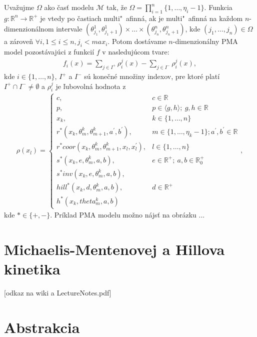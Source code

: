 \documentclass[11pt,final,oneside]{fithesis}
\begin{document}
Uva\v zujme $\Omega$ ako \v cas\v t modelu $\mathcal{M}$ tak, \v ze $\Omega = \prod_{i = 1}^n\{1,\dots{},\eta_i - 1\}$. Funkcia 
$g : \mathbb{R}^n \rightarrow \mathbb{R}^+$ je vtedy po \v castiach multi"~afinn\'a, ak je multi"~afinn\'a na ka\v zdom $n$-dimenzion\'alnom intervale
$(\theta_{j_1}^1,\theta_{j_1 + 1}^1)\times \dots{} \times (\theta_{j_n}^n,\theta_{j_n + 1}^n)$, kde $(j_1,\dots{},j_n) \in \Omega$ a z\'arove\v n 
$\forall{}i, 1 \leq i \leq n, j_i < max_i$. Potom dost\'avame $n$-dimenzion\'alny PMA model pozost\'avaj\'uci z funkci\'i $f$ v nasleduj\'ucom tvare:
\begin{align*}
f_i(x) = \underset{j \in I^+}\sum{\rho_i^j(x)} - \underset{j \in I^-}\sum{\rho_i^j(x)},
\end{align*}
kde $i \in \{1,\dots{},n\}$, $I^+$ a $I^-$ s\'u kone\v cn\'e mno\v ziny indexov, pre ktor\'e plat\'i\ $I^+ \cap I^- \neq \emptyset$ a $\rho_i^j$ je 
\v lubovoln\'a hodnota z 
\begin{align*}
\rho(x_l) = 
\left\{ \begin{array}{cl}
c, &c \in \mathbb{R}\\
p, &p \in \langle g,h \rangle; \ g,h \in \mathbb{R}\\
x_k, & k \in \{1,\dots{},n\}\\
r^*(x_k,\theta_m^k,\theta_{m+1}^k,a^{'},b^{'}), &m \in \{1,\dots{},\eta_k-1\}; a^{'},b^{'} \in \mathbb{R}\\
r^*coor(x_k,\theta_m^k,\theta_{m+1}^k,x_l,x_l^{'}), &l \in \{1,\dots{},n\}\\
s^*(x_k,e,\theta_m^k,a,b), &e \in \mathbb{R}^+; \ a,b \in \mathbb{R}_0^+\\
s^*inv(x_k,e,\theta_m^k,a,b),\\
hill^*(x_k,d,\theta_m^k,a,b), &d \in \mathbb{R}^+\\
h^*(x_k,theta_m^k,a,b)
\end{array} \right. ,
\end{align*}
kde $* \in \{+,-\}$. Pr\'iklad PMA modelu mo\v zno n\'ajs\v t na obr\'azku ...

\section{Michaelis-Mentenovej a Hillova kinetika}
\label{kinetiky}
[odkaz na wiki a LectureNotes.pdf]

\section{Abstrakcia}
\end{document}
